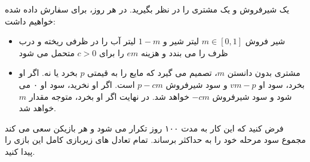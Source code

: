 یک شیرفروش و یک مشتری را در نظر بگیرید. در هر روز، برای سفارش داده شده خواهیم داشت:
\begin{itemize}
    \item
    شیر فروش
    $m \in [0,1]$
    لیتر شیر و 
    $1 - m$
    لیتر آب را در ظرفی ریخته و درب ظرف را می بندد و هزینه $em$ را برای
    $c > 0$
     متحمل می شود
    \item
    مشتری بدون دانستن $m$، تصمیم می گیرد که مایع را به قیمتی $p$ بخرد یا نه. اگر او بخرد، سود او 
    $vm - p$
     و سود شیرفروش 
    $p - cm$
      است. اگر او نخرید، سود او ۰ می شود و سود شیرفروش
    $-cm$
      خواهد شد. در نهایت اگر او بخرد، متوجه مقدار 
    $m$
    خواهد شد.


\end{itemize}
فرض کنید که این کار به مدت ۱۰۰ روز تکرار می شود و هر بازیکن سعی می کند مجموع سود مرحله خود را به حداکثر برساند. تمام تعادل های زیربازی کامل این بازی را پیدا کنید.